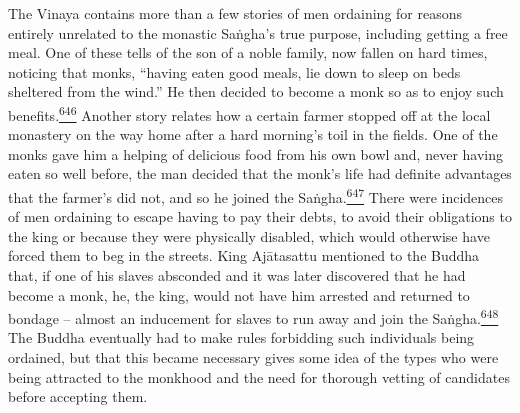 The Vinaya contains more than a few stories of men ordaining for reasons
entirely unrelated to the monastic Saṅgha's true purpose, including
getting a free meal. One of these tells of the son of a noble family,
now fallen on hard times, noticing that monks, ``having eaten good
meals, lie down to sleep on beds sheltered from the wind.'' He then
decided to become a monk so as to enjoy such
benefits.\label{footprints_split_016.html_fnref646}\hyperref[footprints_split_025.htmlux5cux23fn646]{\textsuperscript{646}}
Another story relates how a certain farmer stopped off at the local
monastery on the way home after a hard morning's toil in the fields. One
of the monks gave him a helping of delicious food from his own bowl and,
never having eaten so well before, the man decided that the monk's life
had definite advantages that the farmer's did not, and so he joined the
Saṅgha.\label{footprints_split_016.html_fnref647}\hyperref[footprints_split_025.htmlux5cux23fn647]{\textsuperscript{647}}
There were incidences of men ordaining to escape having to pay their
debts, to avoid their obligations to the king or because they were
physically disabled, which would otherwise have forced them to beg in
the streets. King Ajātasattu mentioned to the Buddha that, if one of his
slaves absconded and it was later discovered that he had become a monk,
he, the king, would not have him arrested and returned to bondage --
almost an inducement for slaves to run away and join the
Saṅgha.\label{footprints_split_016.html_fnref648}\hyperref[footprints_split_025.htmlux5cux23fn648]{\textsuperscript{648}}
The Buddha eventually had to make rules forbidding such individuals
being ordained, but that this became necessary gives some idea of the
types who were being attracted to the monkhood and the need for thorough
vetting of candidates before accepting them.


